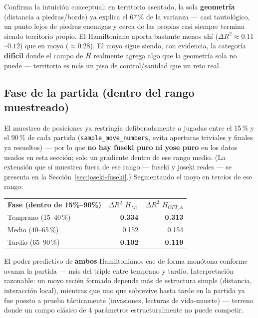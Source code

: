 \documentclass[11pt, a4paper]{article}
\newcommand{\TH}[1]{\cellcolor{cTHbg}\color{white}\textbf{#1}}
\newcommand{\good}[1]{\color{cGood}\textbf{#1}}
\newcommand{\bad}[1]{\color{cBad}\textbf{#1}}
\begin{document}
\begin{tcolorbox}[quotebox]
  Confirma la intuici\'on conceptual: en territorio asentado, la sola
  \textbf{geometr\'ia} (distancia a piedras/borde) ya explica el
  67\,\% de la varianza --- casi tautol\'ogico, un punto lejos de
  piedras enemigas y cerca de las propias casi siempre termina siendo
  territorio propio. El Hamiltoniano aporta bastante menos ah\'i
  ($\Delta R^2\approx0.11$--$0.12$) que en moyo ($\approx0.28$). El
  moyo sigue siendo, con evidencia, la categor\'ia \textbf{dif\'icil}
  donde el campo de $H$ realmente agrega algo que la geometr\'ia sola
  no puede --- territorio es m\'as un piso de control/sanidad que un
  reto real.
\end{tcolorbox}

\subsection{Fase de la partida (dentro del rango muestreado)}

El muestreo de posiciones ya restring\'ia deliberadamente a
jugadas entre el 15\,\% y el 90\,\% de cada partida
(\texttt{sample\_move\_numbers}, evita aperturas triviales y finales ya
resueltos) --- por lo que \textbf{no hay fuseki puro ni yose puro} en
los datos usados en esta secci\'on; solo un gradiente dentro de ese
rango medio. (La extensi\'on que s\'i muestrea fuera de ese rango ---
fuseki y joseki reales --- se presenta en la
Secci\'on~\ref{sec:joseki-fuseki}.) Segmentando el moyo en tercios de ese
rango:

\medskip
\begin{center}
\begin{tabular}{lrr}
  \TH{Fase (dentro de 15\%--90\%)} & \TH{$\Delta R^2$ $H_{M1}$} & \TH{$\Delta R^2$ $H_{OPT\_A}$} \\[1pt]
  Temprano (15--40\,\%) & \good{0.334} & \good{0.313} \\
  Medio (40--65\,\%)    & 0.152 & 0.154 \\
  Tard\'io (65--90\,\%) & \bad{0.102} & \bad{0.119} \\
\end{tabular}
\end{center}
\medskip

\begin{tcolorbox}[quotebox]
  El poder predictivo de \textbf{ambos} Hamiltonianos cae de forma
  mon\'otona conforme avanza la partida --- m\'as del triple entre
  temprano y tard\'io. Interpretaci\'on razonable: un moyo reci\'en
  formado depende m\'as de estructura simple (distancia, interacci\'on
  local), mientras que uno que sobrevive hasta tarde en la partida ya
  fue puesto a prueba t\'acticamente (invasiones, lecturas de vida-muerte)
  --- terreno donde un campo cl\'asico de 4 par\'ametros
  estructuralmente no puede competir.
\end{tcolorbox}
\end{document}
